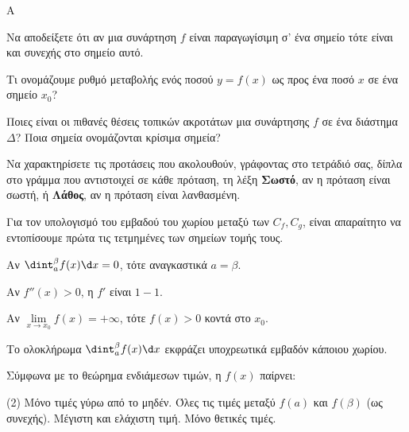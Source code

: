 \begin{thema}{A}
\begin{erwthma}
    \item Να αποδείξετε ότι αν μια συνάρτηση $f$ είναι παραγωγίσιμη σ’ ένα σημείο  τότε είναι και συνεχής στο σημείο αυτό.
    \item Τι ονομάζουμε ρυθμό μεταβολής ενός ποσού $y=f(x)$ ως προς ένα ποσό $x$ σε ένα σημείο $x_0$?
    \item Ποιες είναι οι πιθανές θέσεις τοπικών ακροτάτων μια συνάρτησης $f$ σε ένα διάστημα $\Delta$? Ποια σημεία ονομάζονται κρίσιμα σημεία?
    \item Να χαρακτηρίσετε τις προτάσεις που ακολουθούν, γράφοντας στο τετράδιό σας, δίπλα στο γράμμα που αντιστοιχεί σε κάθε πρόταση, τη λέξη \textbf{Σωστό}, αν η πρόταση είναι σωστή, ή \textbf{Λάθος}, αν η πρόταση είναι λανθασμένη.
    \begin{alist}
        \item Για τον υπολογισμό του εμβαδού του χωρίου μεταξύ των $C_f, C_g$, είναι απαραίτητο να εντοπίσουμε πρώτα τις τετμημένες των σημείων τομής τους.
        \item Αν $\dint_a^\beta f(x)\d x = 0$, τότε αναγκαστικά $a = \beta$.
        \item Αν $f''(x) > 0$, η $f'$ είναι $1-1$.
        \item Αν $\lim\limits_{x\to x_0} f(x) = +\infty$, τότε $f(x) > 0$ κοντά στο $x_0$.
        \item Το ολοκλήρωμα $\dint_{a}^{\beta} f(x) \d x$ εκφράζει υποχρεωτικά εμβαδόν κάποιου χωρίου.
    \end{alist}
    \item Σύμφωνα με το θεώρημα ενδιάμεσων τιμών, η $f(x)$ παίρνει:
    \begin{tasks}[label=\let\textdexiakeraia\relax\alph*.](2)
        \task Μόνο τιμές γύρω από το μηδέν.
        \task Όλες τις τιμές μεταξύ $f(a)$ και $f(\beta)$ (ως συνεχής).
        \task Μέγιστη και ελάχιστη τιμή.
        \task Μόνο θετικές τιμές.
    \end{tasks}
\end{erwthma}
\end{thema}


